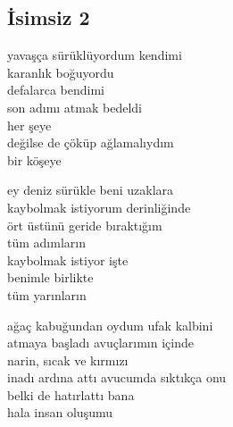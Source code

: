 \subsection{İsimsiz 2}

yavaşça sürüklüyordum kendimi \\
karanlık boğuyordu \\
defalarca bendimi \\
son adımı atmak bedeldi \\
her şeye \\
değilse de çöküp ağlamalıydım \\
bir köşeye

\noindent\newline
ey deniz sürükle beni uzaklara \\
kaybolmak istiyorum derinliğinde \\
ört üstünü geride bıraktığım \\
tüm adımların \\
kaybolmak istiyor işte \\
benimle birlikte \\
tüm yarınların

\noindent\newline
ağaç kabuğundan oydum ufak kalbini \\
atmaya başladı avuçlarımın içinde \\
narin, sıcak ve kırmızı \\
inadı ardına attı avucumda sıktıkça onu \\
belki de hatırlattı bana \\
hala insan oluşumu